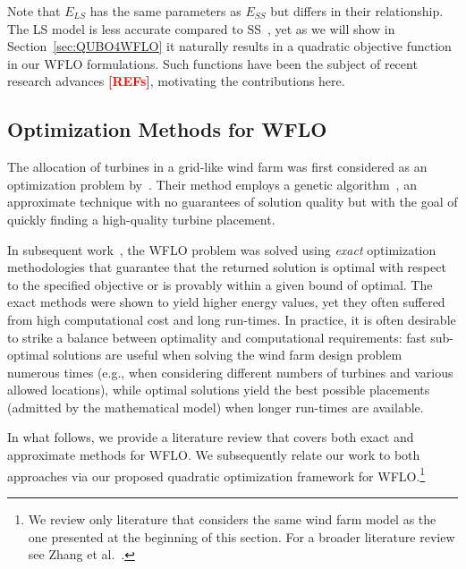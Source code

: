 \documentclass[preprint,12pt]{elsarticle}
\newcommand{\todo}[1]{{\textcolor{red}{\bf {#1}}}}
\begin{document}
Note that $E_{LS}$ has the same parameters as $E_{SS}$ but differs in their relationship.
The LS model is less accurate compared to SS~\cite{Zhang2014}, yet as we will show in Section~\ref{sec:QUBO4WFLO} it 
naturally results in a quadratic objective function in our WFLO formulations. Such functions have been the subject of recent research advances \todo{[REFs]}, motivating the contributions here.
 

\subsection{Optimization Methods for WFLO}

The allocation of turbines in a grid-like wind farm was first
considered as an optimization problem by~\citet{MOSETTI1994105}. Their
method employs a genetic
algorithm~\cite{davis1991handbook}, an approximate technique
with no guarantees of solution quality but with the goal of quickly finding a high-quality turbine placement.


In subsequent work~\cite{turner2014new,Zhang2014}, 
the WFLO problem was solved using \emph{exact}  
optimization methodologies that guarantee that the returned solution is optimal with respect
to the specified objective or is provably within a given bound of optimal.
The exact methods were shown to yield higher energy values, yet they often suffered from 
high computational cost and long run-times. In practice, it is often desirable to strike a balance between optimality and computational requirements: fast sub-optimal solutions are useful when solving the wind farm design problem numerous times (e.g., when considering different numbers of turbines and various allowed locations), while optimal solutions yield the best possible placements (admitted by the mathematical model) when longer run-times are available.

In what follows, we provide a literature review that covers both exact and approximate methods for WFLO. We subsequently relate our 
work to both approaches via our proposed quadratic optimization framework for WFLO.\footnote{We review 
only literature that considers the same wind farm model as the one presented at the beginning of this section. For a broader literature review see Zhang et al.\ \cite{Zhang2014}.} 
 
\end{document}
